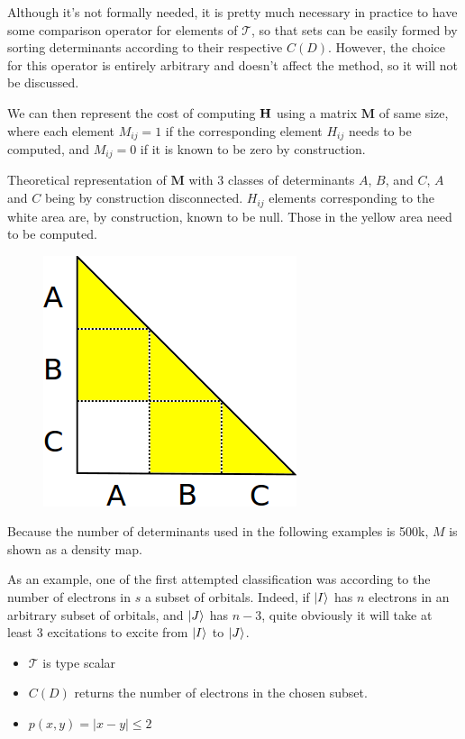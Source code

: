 \documentclass[./thesis.tex]{subfiles}
\begin{document}

Although it's not formally needed, it is pretty much necessary in practice to have some comparison operator for elements of $\mathcal{T}$, so that sets can be easily formed by sorting determinants according to their respective $C(D)$. However, the choice for this operator is entirely arbitrary and doesn't affect the method, so it will not be discussed.
    
    
We can then represent the cost of computing $\mathbf{H}$ using a matrix $\mathbf{M}$ of same size, where each element $M_{ij}=1$ if the corresponding element $H_{ij}$ needs to be computed, and $M_{ij}=0$ if it is known to be zero by construction.

\alert{
Theoretical representation of $\mathbf{M}$ with 3 classes of determinants $A$, $B$, and $C$, $A$ and $C$ being by construction disconnected. $H_{ij}$ elements corresponding to the white area are, by construction, known to be null. Those in the yellow area need to be computed.
}
    
\begin{figure}[h!]
	\begin{center}
		\includegraphics[width=0.4\columnwidth]{figures/davidson/disconnected_classes}
		\caption{{\label{generators_selectors}
		}}
	\end{center}
\end{figure}

Because the number of determinants used in the following examples is 500k, $M$ is shown as a density map.

As an example, one of the first attempted classification was according to the number of electrons in $s$ a subset of orbitals. Indeed, if $\ket I$ has $n$ electrons in an arbitrary subset of orbitals, and $\ket J$ has $n-3$, quite obviously it will take at least 3 excitations to excite from $\ket I$ to $\ket J$.
\begin{itemize}
	\item
	$\mathcal{T}$ is type scalar
	\item
	$C(D)$ returns the number of electrons in the chosen subset.
	\item
	$p(x, y) = |x-y| \leq 2$
\end{itemize}
\end{document}
